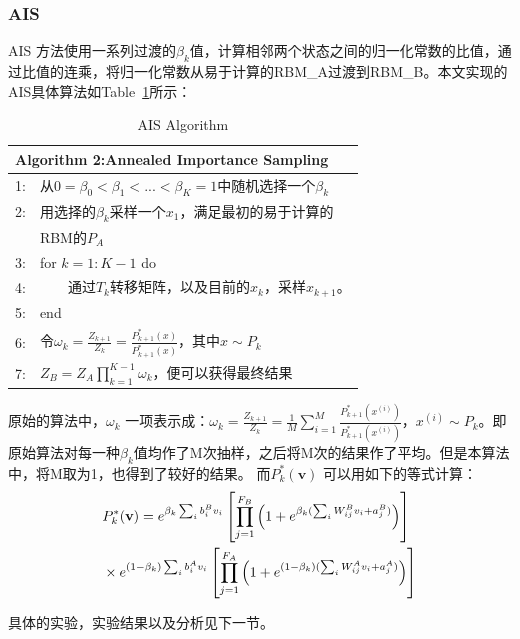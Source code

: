 \documentclass[journal,a4paper]{IEEEtran}
\begin{document}
	\subsubsection{AIS\cite{salakhutdinov2009learning}}
		AIS 方法使用一系列过渡的$\beta_k$值，计算相邻两个状态之间的归一化常数的比值，通过比值的连乘，将归一化常数从易于计算的RBM\_A过渡到RBM\_B。本文实现的AIS具体算法如Table~\ref{tab2}所示：
		\begin{table}[h]
			\begin{tabular}{ll}
				\hline
				\multicolumn{2}{l}{\textbf{Algorithm 2:}Annealed Importance Sampling} \\
				\hline
				1: & 从$ 0=\beta_0<\beta_1<...<\beta_K=1$中随机选择一个$\beta_k$\\
				2: & 用选择的$\beta_k$采样一个$x_1$，满足最初的易于计算的\\
				 & RBM的$P_A$ \\
				3: & for $k = 1 : K-1$ do \\
				4: & ~~~~通过$T_k$转移矩阵，以及目前的$x_k$，采样$x_{k+1}$。\\
				5: & end \\
				6: & 令$ \omega_k = \frac{Z_{k+1}}{Z_k} = \frac{P_{k+1}^*(x)}{P_{k+1}^*(x)}$，其中$ x \sim P_k$\\
				7: & $ Z_B = Z_A\prod_{k=1}^{K-1}\omega_k$，便可以获得最终结果\\

				\hline
			\end{tabular}
			\caption{AIS Algorithm}
			\label{tab2}
		\end{table}

		原始的算法中，$ \omega_k $ 一项表示成：$ \omega_k = \frac{Z_{k+1}}{Z_k} =\frac{1}{M} \sum_{i = 1}^{M} \frac{P_{k+1}^*(x^{(i)})}{P_{k+1}^*(x^{(i)})}$，$x^{(i)} \sim P_k$。即原始算法对每一种$\beta_k$值均作了M次抽样，之后将M次的结果作了平均。但是本算法中，将M取为1，也得到了较好的结果。
		而$P_k^*(\mathbf{v})$ 可以用如下的等式计算：
		\begin{align}
		 & P_k^*(\mathbf{v}) = e^{\beta_k\sum_i b_i^Bv_i} \left[\prod_{j=1}^{F_B} \left(1+e^{\beta_k(\sum_i W_{ij}^Bv_i+a_j^B)}\right)\right] \notag\\
		 & \times e^{(1-\beta_k)\sum_i b_i^Av_i} \left[\prod_{j=1}^{F_A} \left(1+e^{(1-\beta_k)(\sum_i W_{ij}^Av_i+a_j^A)}\right)\right]
		 \label{equ8}
		\end{align}

		具体的实验，实验结果以及分析见下一节。
\end{document}

